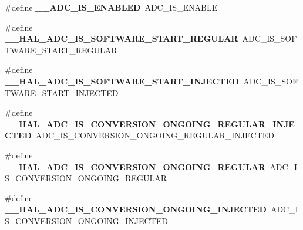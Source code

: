 \begin{DoxyCompactItemize}
\item 
\#define {\bfseries \+\_\+\+\_\+\+A\+D\+C\+\_\+\+I\+S\+\_\+\+E\+N\+A\+B\+L\+ED}~A\+D\+C\+\_\+\+I\+S\+\_\+\+E\+N\+A\+B\+LE\hypertarget{group___h_a_l___a_d_c___aliased___macros_ga32e5ccb7060b98a06749eb20d922d51b}{}\label{group___h_a_l___a_d_c___aliased___macros_ga32e5ccb7060b98a06749eb20d922d51b}

\item 
\#define {\bfseries \+\_\+\+\_\+\+H\+A\+L\+\_\+\+A\+D\+C\+\_\+\+I\+S\+\_\+\+S\+O\+F\+T\+W\+A\+R\+E\+\_\+\+S\+T\+A\+R\+T\+\_\+\+R\+E\+G\+U\+L\+AR}~A\+D\+C\+\_\+\+I\+S\+\_\+\+S\+O\+F\+T\+W\+A\+R\+E\+\_\+\+S\+T\+A\+R\+T\+\_\+\+R\+E\+G\+U\+L\+AR\hypertarget{group___h_a_l___a_d_c___aliased___macros_gad995b81efb72f4fe37152863d465bace}{}\label{group___h_a_l___a_d_c___aliased___macros_gad995b81efb72f4fe37152863d465bace}

\item 
\#define {\bfseries \+\_\+\+\_\+\+H\+A\+L\+\_\+\+A\+D\+C\+\_\+\+I\+S\+\_\+\+S\+O\+F\+T\+W\+A\+R\+E\+\_\+\+S\+T\+A\+R\+T\+\_\+\+I\+N\+J\+E\+C\+T\+ED}~A\+D\+C\+\_\+\+I\+S\+\_\+\+S\+O\+F\+T\+W\+A\+R\+E\+\_\+\+S\+T\+A\+R\+T\+\_\+\+I\+N\+J\+E\+C\+T\+ED\hypertarget{group___h_a_l___a_d_c___aliased___macros_ga5fa40578941f107c4ae1308e14266f7d}{}\label{group___h_a_l___a_d_c___aliased___macros_ga5fa40578941f107c4ae1308e14266f7d}

\item 
\#define {\bfseries \+\_\+\+\_\+\+H\+A\+L\+\_\+\+A\+D\+C\+\_\+\+I\+S\+\_\+\+C\+O\+N\+V\+E\+R\+S\+I\+O\+N\+\_\+\+O\+N\+G\+O\+I\+N\+G\+\_\+\+R\+E\+G\+U\+L\+A\+R\+\_\+\+I\+N\+J\+E\+C\+T\+ED}~A\+D\+C\+\_\+\+I\+S\+\_\+\+C\+O\+N\+V\+E\+R\+S\+I\+O\+N\+\_\+\+O\+N\+G\+O\+I\+N\+G\+\_\+\+R\+E\+G\+U\+L\+A\+R\+\_\+\+I\+N\+J\+E\+C\+T\+ED\hypertarget{group___h_a_l___a_d_c___aliased___macros_ga573771917c650599112d38dc260f785b}{}\label{group___h_a_l___a_d_c___aliased___macros_ga573771917c650599112d38dc260f785b}

\item 
\#define {\bfseries \+\_\+\+\_\+\+H\+A\+L\+\_\+\+A\+D\+C\+\_\+\+I\+S\+\_\+\+C\+O\+N\+V\+E\+R\+S\+I\+O\+N\+\_\+\+O\+N\+G\+O\+I\+N\+G\+\_\+\+R\+E\+G\+U\+L\+AR}~A\+D\+C\+\_\+\+I\+S\+\_\+\+C\+O\+N\+V\+E\+R\+S\+I\+O\+N\+\_\+\+O\+N\+G\+O\+I\+N\+G\+\_\+\+R\+E\+G\+U\+L\+AR\hypertarget{group___h_a_l___a_d_c___aliased___macros_gaf6d1e4fb1fd1bca13b6c22953e805698}{}\label{group___h_a_l___a_d_c___aliased___macros_gaf6d1e4fb1fd1bca13b6c22953e805698}

\item 
\#define {\bfseries \+\_\+\+\_\+\+H\+A\+L\+\_\+\+A\+D\+C\+\_\+\+I\+S\+\_\+\+C\+O\+N\+V\+E\+R\+S\+I\+O\+N\+\_\+\+O\+N\+G\+O\+I\+N\+G\+\_\+\+I\+N\+J\+E\+C\+T\+ED}~A\+D\+C\+\_\+\+I\+S\+\_\+\+C\+O\+N\+V\+E\+R\+S\+I\+O\+N\+\_\+\+O\+N\+G\+O\+I\+N\+G\+\_\+\+I\+N\+J\+E\+C\+T\+ED\hypertarget{group___h_a_l___a_d_c___aliased___macros_ga085a3824fd83a50c46bcc8edaf0f986d}{}\label{group___h_a_l___a_d_c___aliased___macros_ga085a3824fd83a50c46bcc8edaf0f986d}


\end{DoxyCompactItemize}
